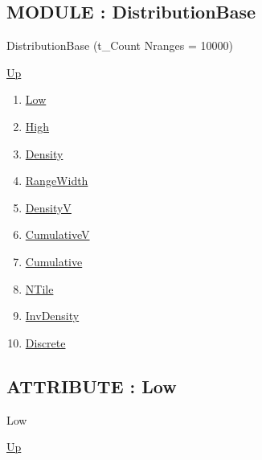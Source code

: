 \par
\par
\subsection*{MODULE : DistributionBase}
\hypertarget{ecldoc:linearregression.ols.distributionbase}{}
\begin{minipage}[t]{\textwidth}
\begin{flushleft}
 DistributionBase (t\_Count Nranges = 10000)
\end{flushleft}
\end{minipage}
\hyperlink{ecldoc:linearregression.ols}{Up}

\par
\par
\begin{enumerate}
\item \hyperlink{ecldoc:linearregression.ols.distributionbase.low}{Low}
\item \hyperlink{ecldoc:linearregression.ols.distributionbase.high}{High}
\item \hyperlink{ecldoc:linearregression.ols.distributionbase.density}{Density}
\item \hyperlink{ecldoc:linearregression.ols.distributionbase.rangewidth}{RangeWidth}
\item \hyperlink{ecldoc:linearregression.ols.distributionbase.densityv}{DensityV}
\item \hyperlink{ecldoc:linearregression.ols.distributionbase.cumulativev}{CumulativeV}
\item \hyperlink{ecldoc:linearregression.ols.distributionbase.cumulative}{Cumulative}
\item \hyperlink{ecldoc:linearregression.ols.distributionbase.ntile}{NTile}
\item \hyperlink{ecldoc:linearregression.ols.distributionbase.invdensity}{InvDensity}
\item \hyperlink{ecldoc:linearregression.ols.distributionbase.discrete}{Discrete}
\end{enumerate}
\subsection*{ATTRIBUTE : Low}
\hypertarget{ecldoc:linearregression.ols.distributionbase.low}{}
\begin{minipage}[t]{\textwidth}
\begin{flushleft}
 Low 
\end{flushleft}
\end{minipage}
\hyperlink{ecldoc:linearregression.ols.distributionbase}{Up}

